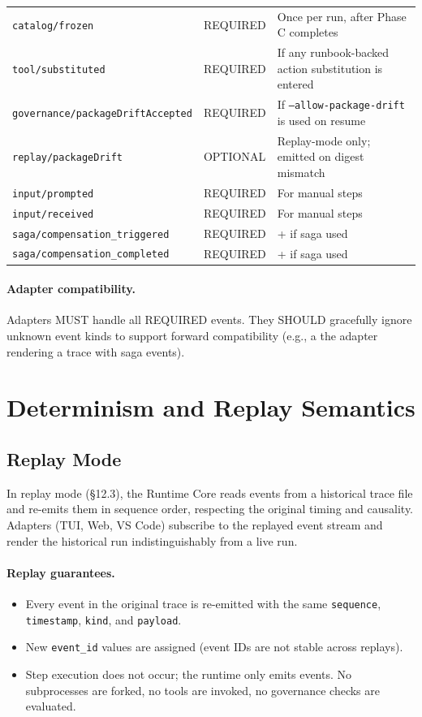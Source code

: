 \begin{center}
\begin{tabular}{llp{6cm}}
\texttt{catalog/frozen} & REQUIRED & Once per run, after Phase C completes \\
\texttt{tool/substituted} & REQUIRED & If any runbook-backed action substitution is entered \\
\texttt{governance/packageDriftAccepted} & REQUIRED & If \texttt{--allow-package-drift} is used on resume \\
\texttt{replay/packageDrift} & OPTIONAL & Replay-mode only; emitted on digest mismatch \\
\texttt{input/prompted} & REQUIRED & For manual steps \\
\texttt{input/received} & REQUIRED & For manual steps \\
\texttt{saga/compensation\_triggered} & REQUIRED & + if saga used \\
\texttt{saga/compensation\_completed} & REQUIRED & + if saga used \\
\end{tabular}
\end{center}

\paragraph{Adapter compatibility.} Adapters MUST handle all REQUIRED events. They SHOULD gracefully ignore unknown event kinds to support forward compatibility (e.g., a the adapter rendering a trace with saga events).

\section{Determinism and Replay Semantics}

\subsection{Replay Mode}

In replay mode (§12.3), the Runtime Core reads events from a historical trace file and re-emits them in sequence order, respecting the original timing and causality. Adapters (TUI, Web, VS Code) subscribe to the replayed event stream and render the historical run indistinguishably from a live run.

\paragraph{Replay guarantees.}
\begin{itemize}
  \item Every event in the original trace is re-emitted with the same \texttt{sequence}, \texttt{timestamp}, \texttt{kind}, and \texttt{payload}.
  \item New \texttt{event\_id} values are assigned (event IDs are not stable across replays).
  \item Step execution does not occur; the runtime only emits events. No subprocesses are forked, no tools are invoked, no governance checks are evaluated.
\end{itemize}

